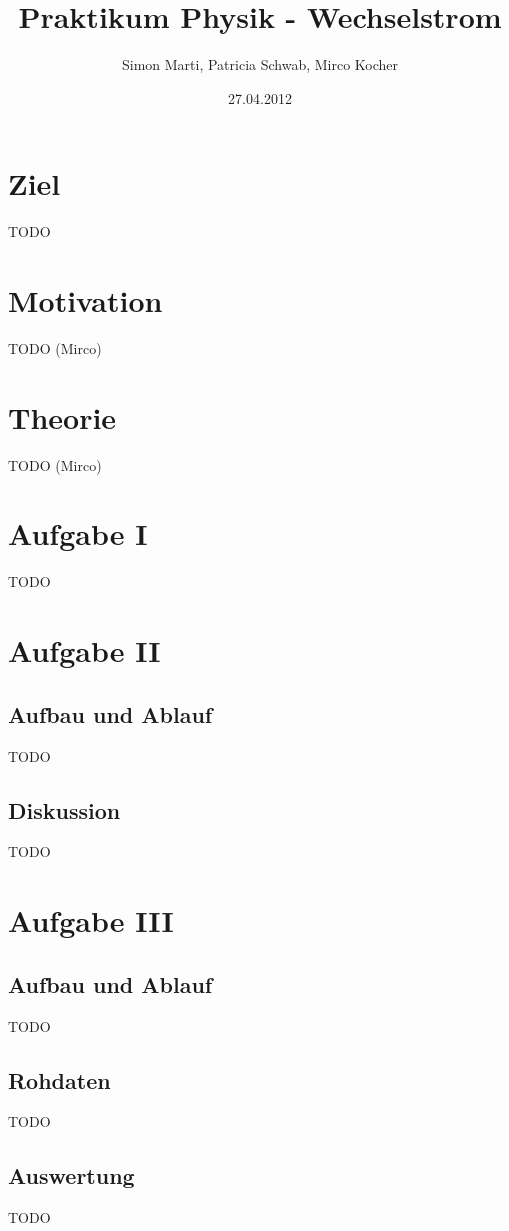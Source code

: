 \documentclass[12pt,a4paper]{article}
\title{Praktikum Physik - Wechselstrom}
\author{Simon Marti, Patricia Schwab, Mirco Kocher}
\date{27.04.2012}
\begin{document}
\maketitle

\section*{Ziel}
TODO


\section*{Motivation}
TODO (Mirco)


\section*{Theorie}
TODO (Mirco)


\section*{Aufgabe I}
TODO


\section*{Aufgabe II}
\subsection*{Aufbau und Ablauf}
TODO

\subsection*{Diskussion}
TODO


\section*{Aufgabe III}
\subsection*{Aufbau und Ablauf}
TODO

\subsection*{Rohdaten}
TODO

\subsection*{Auswertung}
TODO
\end{document}
